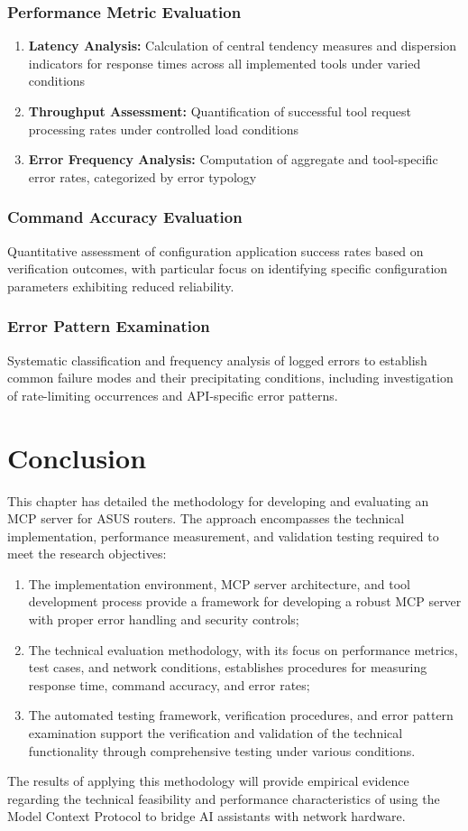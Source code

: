 \subsubsection{Performance Metric Evaluation}
\begin{enumerate}
\item \textbf{Latency Analysis:} Calculation of central tendency measures and dispersion indicators for response times across all implemented tools under varied conditions
\item \textbf{Throughput Assessment:} Quantification of successful tool request processing rates under controlled load conditions

\item \textbf{Error Frequency Analysis:} Computation of aggregate and tool-specific error rates, categorized by error typology

\end{enumerate}
\subsubsection{Command Accuracy Evaluation}
Quantitative assessment of configuration application success rates based on verification outcomes, with particular focus on identifying specific configuration parameters exhibiting reduced reliability.
\subsubsection{Error Pattern Examination}
Systematic classification and frequency analysis of logged errors to establish common failure modes and their precipitating conditions, including investigation of rate-limiting occurrences and API-specific error patterns.
\section{Conclusion}
This chapter has detailed the methodology for developing and evaluating an MCP server for ASUS routers. The approach encompasses the technical implementation, performance measurement, and validation testing required to meet the research objectives:
\begin{enumerate}
\item The implementation environment, MCP server architecture, and tool development process provide a framework for developing a robust MCP server with proper error handling and security controls;
\item The technical evaluation methodology, with its focus on performance metrics, test cases, and network conditions, establishes procedures for measuring response time, command accuracy, and error rates;
\item The automated testing framework, verification procedures, and error pattern examination support the verification and validation of the technical functionality through comprehensive testing under various conditions.
\end{enumerate}
The results of applying this methodology will provide empirical evidence regarding the technical feasibility and performance characteristics of using the Model Context Protocol to bridge AI assistants with network hardware.
